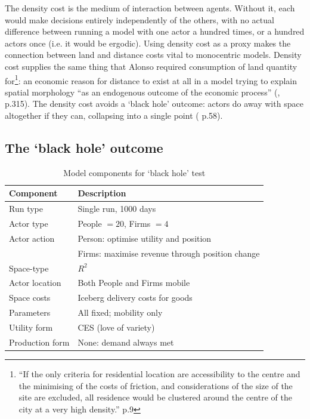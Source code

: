 The density cost is the medium of interaction between agents. Without it, each would make decisions entirely independently of the others, with no actual difference between running a model with one actor a hundred times, or a hundred actors once (i.e. it would be ergodic). Using density cost as a proxy makes the connection between land and distance costs vital to monocentric models. Density cost supplies the same thing that Alonso required consumption of land quantity for\footnote{``If the only criteria for residential location are accessibility to the centre and the minimising of the costs of friction, and considerations of the size of the site are excluded, all residence would be clustered around the centre of the city at a very high density.'' \citealt{alonso_location_1964} p.9}: an economic reason for distance to exist at all in a model trying to explain spatial morphology ``as an endogenous outcome of the economic process'' (\citealt{storper_agglomeration_2010}, p.315). The density cost avoids a `black hole' outcome: actors do away with space altogether if they can, collapsing into a single point (\citealt{fujita_location_1999} p.58).

\subsection{The `black hole’ outcome \label{sec:blackholemodel}}

%
\renewcommand{\arraystretch}{1.2}
\begin{table}[!hbt]
\begin{center}

\begin{tabular}{|l|l|}
\hline 
\textbf{Component} & \textbf{Description}\\
\hline
Run type & Single run, 1000 days  \\
\hline
Actor type & People $ = 20$, Firms $= 4$ \\
\hline
Actor action & Person: optimise utility and position\\
& Firms: maximise revenue through position change\\
\hline
Space-type & $R^2$\\
\hline
Actor location & Both People and Firms mobile\\ 
\hline
Space costs & Iceberg delivery costs for goods \\
\hline
Parameters & All fixed; mobility only\\
\hline
Utility form & CES (love of variety)\\
\hline
Production form & None: demand always met\\
\hline

\end{tabular}

\caption{Model components for `black hole’ test \label{tab:blackhole}}
\end{center}
\end{table}


